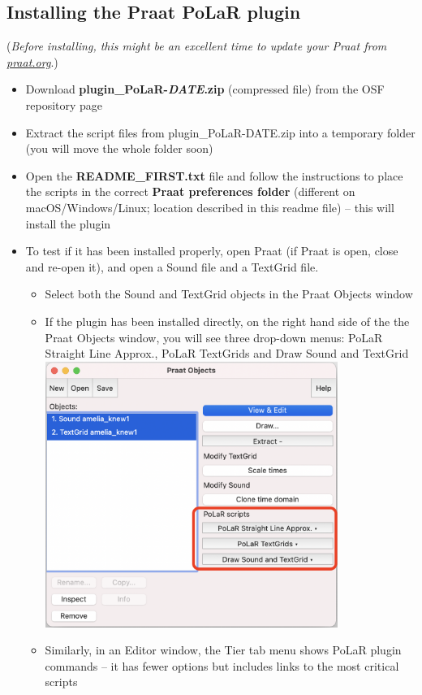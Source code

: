 \documentclass[11pt, twoside]{memoir}
\begin{document}
\subsection{Installing the Praat PoLaR plugin}
(\textit{Before installing, this might be an excellent time to update your Praat from \href{https://www.praat.org}{praat.org}}.)
\begin{itemize}
	\item Download \textbf{plugin\_PoLaR-\textit{DATE}.zip} (compressed file) from the OSF repository page
	\item Extract the script files from plugin\_PoLaR-DATE.zip into a temporary folder (you will move the whole folder soon)
	\item Open the \textbf{README\_FIRST.txt} file and follow the instructions to place the scripts in the correct \textbf{Praat preferences folder} (different on macOS\slash Windows\slash Linux; location described in this readme file) – this will install the plugin
	\item To test if it has been installed properly, open Praat (if Praat is open, close and re-open it), and open a Sound file and a TextGrid file.
	\begin{itemize}
		\item Select both the Sound and TextGrid objects in the Praat Objects window
		\item If the plugin has been installed directly, on the right hand side of the the Praat Objects window, you will see three drop-down menus: PoLaR Straight Line Approx., PoLaR TextGrids and Draw Sound and TextGrid\\
			\includegraphics[width=3.75in]{Practical-Plugin-1-Objects-Window-Scripts.png}
		\item Similarly, in an Editor window, the Tier tab menu shows PoLaR plugin commands – it has fewer options but includes links to the most critical scripts\\

\end{itemize}
\end{itemize}
\end{document}
